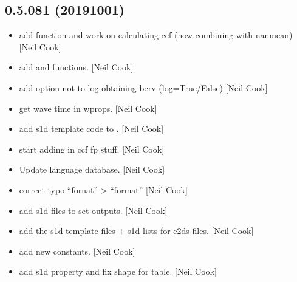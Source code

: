 \documentclass[a4paper,10pt,english]{report}
\begin{document}
\subsection{0.5.081 (2019\sphinxhyphen{}10\sphinxhyphen{}01)}
\label{\detokenize{misc/changelog:id81}}\begin{itemize}
\item {} 
 \sphinxhyphen{} add  function and
work on calculating ccf (now combining with nanmean) {[}Neil Cook{]}

\item {} 
 \sphinxhyphen{} add  and
 functions. {[}Neil Cook{]}

\item {} 
 \sphinxhyphen{} add option not to log obtaining berv
(log=True/False) {[}Neil Cook{]}

\item {} 
 \sphinxhyphen{} get wave time in wprops. {[}Neil Cook{]}

\item {} 
 \sphinxhyphen{} add s1d template code to
. {[}Neil Cook{]}

\item {} 
 \sphinxhyphen{} start adding in ccf fp stuff. {[}Neil
Cook{]}

\item {} 
Update language database. {[}Neil Cook{]}

\item {} 
 \sphinxhyphen{} correct typo “fornat” \textendash{}\textgreater{} “format” {[}Neil Cook{]}

\item {} 
 \sphinxhyphen{} add s1d files to set
outputs. {[}Neil Cook{]}

\item {} 
 \sphinxhyphen{} add the s1d template
files + s1d lists for e2ds files. {[}Neil Cook{]}

\item {} 
 \sphinxhyphen{} add new 
constants. {[}Neil Cook{]}

\item {} 
 \sphinxhyphen{} add s1d property and fix shape for table.
{[}Neil Cook{]}

\end{itemize}
\end{document}
